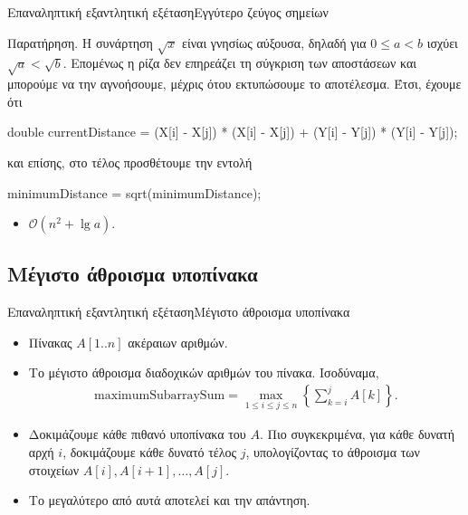 \documentclass[t,aspectratio=169,9pt]{beamer}
\begin{document}
\begin{frame}[fragile]{Επαναληπτική εξαντλητική εξέταση}{Εγγύτερο ζεύγος σημείων}
    \begin{block}{Παρατήρηση.}
        Η συνάρτηση $\sqrt{x}$ είναι γνησίως αύξουσα, δηλαδή για $0 \leq a < b$ ισχύει $\sqrt{a} < \sqrt{b}$.
        Επομένως η ρίζα δεν επηρεάζει τη σύγκριση των αποστάσεων και μπορούμε να την αγνοήσουμε,
        μέχρις ότου εκτυπώσουμε το αποτέλεσμα. Έτσι, έχουμε ότι
        \begin{cpp}
            double currentDistance = (X[i] - X[j]) * (X[i] - X[j]) + (Y[i] - Y[j]) * (Y[i] - Y[j]);
        \end{cpp}
        και επίσης, στο τέλος προσθέτουμε την εντολή
        \begin{cpp}
            minimumDistance = sqrt(minimumDistance);
        \end{cpp}
    \end{block}
    \pause
    \begin{itemize}
        \item $\mathcal{O}(n^2 + \lg a)$.
    \end{itemize}
\end{frame}

\subsection{Μέγιστο άθροισμα υποπίνακα}
\begin{frame}{Επαναληπτική εξαντλητική εξέταση}{Μέγιστο άθροισμα υποπίνακα}
    \begin{itemize}
        \pause
        \item Πίνακας $A[1..n]$ ακέραιων αριθμών.
    \end{itemize}
    \pause
    \begin{itemize}
        \pause
        \item Το μέγιστο άθροισμα διαδοχικών αριθμών του πίνακα. Ισοδύναμα, 
        \begin{align*}
            \text{maximumSubarraySum} = \max_{1 \leq i \leq j \leq n}\left\{\sum_{k = i}^{j} A[k]\right\}.
        \end{align*}
    \end{itemize}
    \pause
    \begin{itemize}
        \pause 
        \item Δοκιμάζουμε κάθε πιθανό υποπίνακα του $A$. Πιο συγκεκριμένα, για κάθε δυνατή αρχή $i$, δοκιμάζουμε κάθε δυνατό τέλος $j$, υπολογίζοντας 
        το άθροισμα των στοιχείων $A[i], A[i + 1], \dots, A[j]$.
        \pause
        \item Το μεγαλύτερο από αυτά αποτελεί και την απάντηση.
    \end{itemize}
\end{frame}
\end{document}
